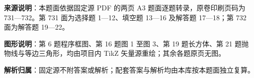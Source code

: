 

\begin{gknotice}
\textbf{来源说明}：本题面依据固定源 PDF 的两页 A3 题面逐题转录，原卷印刷页码为 731—732。第 731 面为选择题 1—12、填空题 13—16 及解答题 17—18；第 732 面为解答题 19—22。

\textbf{图形说明}：第 6 题程序框图、第 16 题图 1 至图 3、第 19 题长方体、第 21 题抛物线与等边三角形，均由项目内 TikZ 矢量源重绘；其余各题原页无图。

\textbf{解析归属}：固定源不附答案或解析；配套答案与解析均由本库按本题面独立复算。
\end{gknotice}


